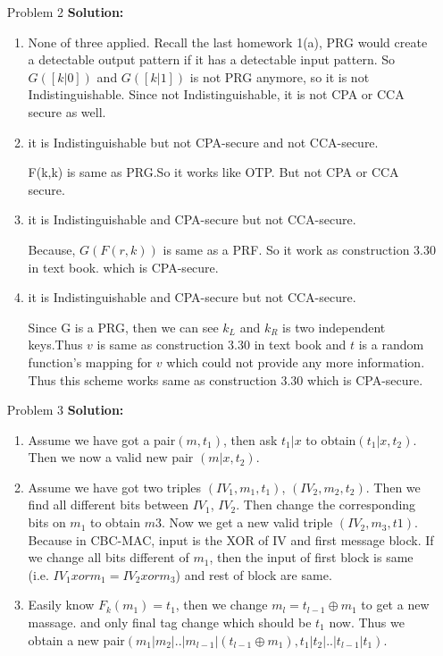 \normalfont\documentclass[letterpaper,11pt]{article}
\begin{document}
\begin{enumerate}
\begin{enumerate}
	\end{enumerate}
\item [Problem 2]\textbf{Solution:}\par
	\begin{enumerate}
		\item None of three applied. Recall the last homework 1(a), PRG would create a detectable output pattern if it has a detectable input pattern. So $G([k|0])$ and $G([k|1])$ is not PRG anymore, so it is not Indistinguishable. Since not Indistinguishable, it is not CPA or CCA secure as well.
		\item it is Indistinguishable but not CPA-secure and not CCA-secure.\par
			F(k,k) is same as PRG.So it works like OTP. But not CPA or CCA secure.
		\item it is Indistinguishable and CPA-secure but not CCA-secure. \par
			Because, $G(F(r,k))$ is same as a PRF. So it work as construction 3.30 in text book. which is CPA-secure.
		\item it is Indistinguishable and CPA-secure but not CCA-secure. \par
			Since G is a PRG, then we can see $k_L$ and $k_R$ is two independent keys.Thus $v$ is same as construction 3.30 in text book and $t$ is a random function's mapping for $v$ which could not provide any more information. Thus this scheme works same as construction 3.30 which is CPA-secure.
	\end{enumerate}
\item [Problem 3]\textbf{Solution:}\par
	\begin{enumerate}
		\item Assume we have got a pair$(m,t_1)$, then ask $t_1|x$ to obtain$(t_1|x,t_2)$. Then we now a valid new pair $(m|x,t_2)$.
		\item Assume we have got two triples $(IV_1,m_1,t_1)$, $(IV_2,m_2,t_2)$. Then we find all different bits between $IV_1$, $IV_2$. Then change the corresponding bits on $m_1$ to obtain $m3$. Now we get a new valid triple $(IV_2,m_3,t1)$. Because in CBC-MAC, input is the XOR of IV and first message block. If we change all bits different of $m_1$, then the input of first block is same (i.e. $IV_1 xor m_1 = IV_2 xor m_3$) and rest of block are same.
		\item
			Easily know $F_k(m_1) = t_1$, then we change $m_l = t_{l-1} \oplus m_1$ to get a new massage. and only final tag change which should be $t_1$ now. Thus we obtain a new pair$(m_1|m_2|..|m_{l-1}|(t_{l-1}\oplus m_1), t_1|t_2|..|t_{l-1}|t_1)$.

\end{enumerate}
\end{enumerate}
\end{document}
